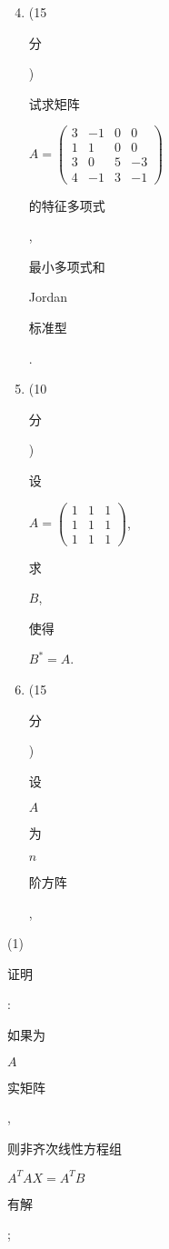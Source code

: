 \documentclass[10pt]{article}
\begin{document}
\begin{enumerate}
  \setcounter{enumi}{3}
  \item (15 \begin{CJK}{UTF8}{mj}分\end{CJK}) \begin{CJK}{UTF8}{mj}试求矩阵\end{CJK} $A=\left(\begin{array}{cccc}3 & -1 & 0 & 0 \\ 1 & 1 & 0 & 0 \\ 3 & 0 & 5 & -3 \\ 4 & -1 & 3 & -1\end{array}\right)$ \begin{CJK}{UTF8}{mj}的特征多项式\end{CJK}, \begin{CJK}{UTF8}{mj}最小多项式和\end{CJK} Jordan \begin{CJK}{UTF8}{mj}标准型\end{CJK}.

  \item (10 \begin{CJK}{UTF8}{mj}分\end{CJK}) \begin{CJK}{UTF8}{mj}设\end{CJK} $A=\left(\begin{array}{lll}1 & 1 & 1 \\ 1 & 1 & 1 \\ 1 & 1 & 1\end{array}\right)$, \begin{CJK}{UTF8}{mj}求\end{CJK} $B$, \begin{CJK}{UTF8}{mj}使得\end{CJK} $B^{*}=A$.

  \item (15 \begin{CJK}{UTF8}{mj}分\end{CJK}) \begin{CJK}{UTF8}{mj}设\end{CJK} $A$ \begin{CJK}{UTF8}{mj}为\end{CJK} $n$ \begin{CJK}{UTF8}{mj}阶方阵\end{CJK},

\end{enumerate}
(1) \begin{CJK}{UTF8}{mj}证明\end{CJK}: \begin{CJK}{UTF8}{mj}如果为\end{CJK} $A$ \begin{CJK}{UTF8}{mj}实矩阵\end{CJK}, \begin{CJK}{UTF8}{mj}则非齐次线性方程组\end{CJK} $A^{T} A X=A^{T} B$ \begin{CJK}{UTF8}{mj}有解\end{CJK};
\end{document}
